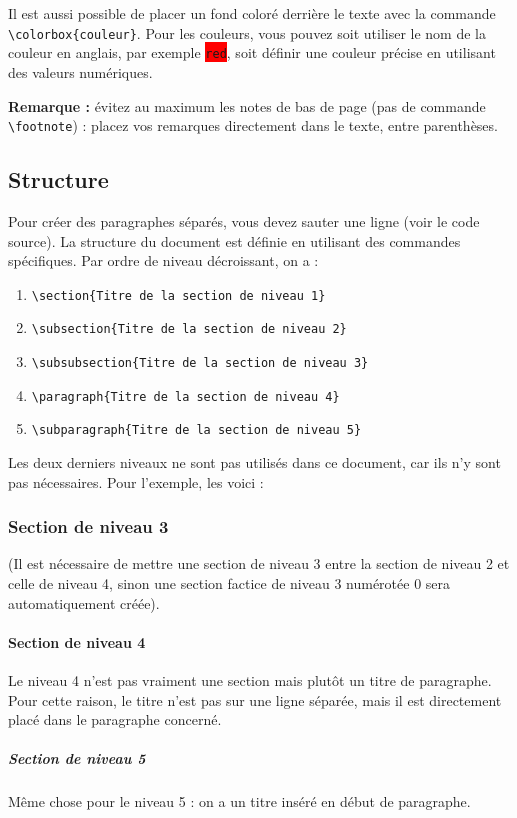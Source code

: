 \documentclass{ceri}
\begin{document}
Il est aussi possible de placer un fond coloré derrière le texte avec la commande \texttt{\textbackslash{}colorbox\{couleur\}}. Pour les couleurs, vous pouvez soit utiliser le nom de la couleur en anglais, par exemple \colorbox{red}{\texttt{red}}, soit définir une couleur précise en utilisant des valeurs numériques.

\textbf{Remarque :} évitez au maximum les notes de bas de page (pas de commande \texttt{\textbackslash{}footnote}) : placez vos remarques directement dans le texte, entre parenthèses.

\subsection{Structure}
\label{sec:structure}
Pour créer des paragraphes séparés, vous devez sauter une ligne (voir le code source). La structure du document est définie en utilisant des commandes spécifiques. Par ordre de niveau décroissant, on a :
\begin{enumerate}
	\item \texttt{\textbackslash{}section\{Titre de la section de niveau 1\}}
	\item \texttt{\textbackslash{}subsection\{Titre de la section de niveau 2\}}
	\item \texttt{\textbackslash{}subsubsection\{Titre de la section de niveau 3\}}
	\item \texttt{\textbackslash{}paragraph\{Titre de la section de niveau 4\}}
	\item \texttt{\textbackslash{}subparagraph\{Titre de la section de niveau 5\}}
\end{enumerate}

Les deux derniers niveaux ne sont pas utilisés dans ce document, car ils n'y sont pas nécessaires. Pour l'exemple, les voici :
\subsubsection{Section de niveau 3}
(Il est nécessaire de mettre une section de niveau 3 entre la section de niveau 2 et celle de niveau 4, sinon une section factice de niveau 3 numérotée 0 sera automatiquement créée).
\paragraph{Section de niveau 4}
Le niveau 4 n'est pas vraiment une section mais plutôt un titre de paragraphe. Pour cette raison, le titre n'est pas sur une ligne séparée, mais il est directement placé dans le paragraphe concerné.
\subparagraph{Section de niveau 5}
Même chose pour le niveau 5 : on a un titre inséré en début de paragraphe.
	
\end{document}
